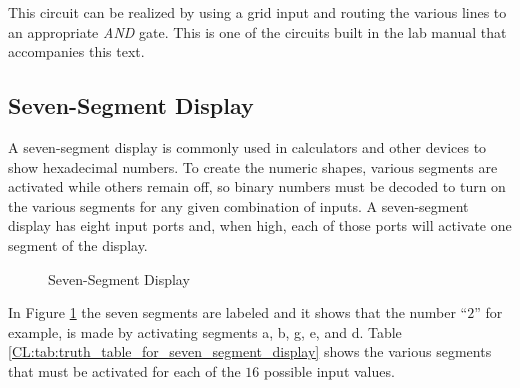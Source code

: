 This circuit can be realized by using a grid input and routing the various lines to an appropriate \emph{AND} gate. This is one of the circuits built in the lab manual that accompanies this text.

\subsection{Seven-Segment Display}
\label{CL:subsec:7_segment_display}

A seven-segment display is commonly used in calculators and other devices to show hexadecimal numbers. To create the numeric shapes, various segments are activated while others remain off, so binary numbers must be decoded to turn on the various segments for any given combination of inputs. A seven-segment display has eight input ports and, when high, each of those ports will activate one segment of the display. 

\begin{figure}[H]
  \caption{Seven-Segment Display}
  \label{CL:fig:seven_segment_display}  
  \myfloatalign
\end{figure}
 

In Figure \ref{CL:fig:seven_segment_display} the seven segments are labeled and it shows that the number ``$ 2 $'' for example, is made by activating segments \textsf{a}, \textsf{b}, \textsf{g}, \textsf{e}, and \textsf{d}. Table \ref{CL:tab:truth_table_for_seven_segment_display} shows the various segments that must be activated for each of the $ 16 $ possible input values.

